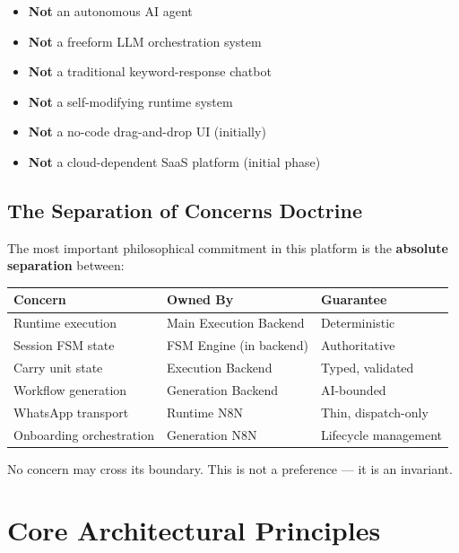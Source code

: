 \documentclass[12pt, a4paper]{report}
\newenvironment{warningbox}{%
  \begin{tcolorbox}[
    colback=yellow!10!white,
    colframe=orange!80!black,
    title={\textbf{ARCHITECTURAL WARNING}},
    fonttitle=\small\bfseries
  ]
}{%
  \end{tcolorbox}
}
\begin{document}
\begin{warningbox}
\begin{itemize}
  \item \textbf{Not} an autonomous AI agent
  \item \textbf{Not} a freeform LLM orchestration system
  \item \textbf{Not} a traditional keyword-response chatbot
  \item \textbf{Not} a self-modifying runtime system
  \item \textbf{Not} a no-code drag-and-drop UI (initially)
  \item \textbf{Not} a cloud-dependent SaaS platform (initial phase)
\end{itemize}
\end{warningbox}

\section{The Separation of Concerns Doctrine}

The most important philosophical commitment in this platform is the \textbf{absolute separation} between:

\begin{center}
\begin{tabular}{lll}
\toprule
\textbf{Concern} & \textbf{Owned By} & \textbf{Guarantee} \\
\midrule
Runtime execution & Main Execution Backend & Deterministic \\
Session FSM state & FSM Engine (in backend) & Authoritative \\
Carry unit state & Execution Backend & Typed, validated \\
Workflow generation & Generation Backend & AI-bounded \\
WhatsApp transport & Runtime N8N & Thin, dispatch-only \\
Onboarding orchestration & Generation N8N & Lifecycle management \\
\bottomrule
\end{tabular}
\end{center}

No concern may cross its boundary. This is not a preference --- it is an invariant.

\chapter{Core Architectural Principles}
\end{document}
